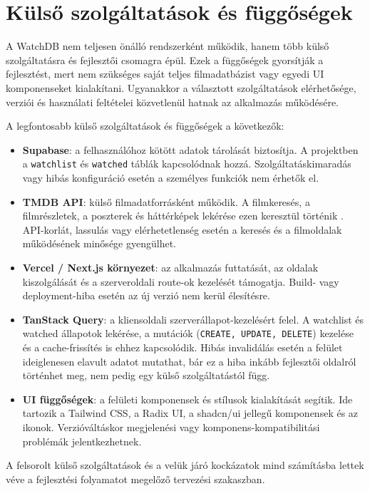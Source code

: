 \section{Külső szolgáltatások és függőségek}

A WatchDB nem teljesen önálló rendszerként működik, hanem több külső szolgáltatásra és fejlesztői csomagra épül. Ezek a függőségek gyorsítják a fejlesztést, mert nem szükséges saját teljes filmadatbázist vagy egyedi UI komponenseket kialakítani. Ugyanakkor a választott szolgáltatások elérhetősége, verziói és használati feltételei közvetlenül hatnak az alkalmazás működésére.

A legfontosabb külső szolgáltatások és függőségek a következők:

\begin{itemize}
    \item \textbf{Supabase}: a felhasználóhoz kötött adatok tárolását biztosítja. A projektben a \texttt{watchlist} és \texttt{watched} táblák kapcsolódnak hozzá. Szolgáltatáskimaradás vagy hibás konfiguráció esetén a személyes funkciók nem érhetők el.
    \item \textbf{TMDB API}: külső filmadatforrásként működik. A filmkeresés, a filmrészletek, a poszterek és háttérképek lekérése ezen keresztül történik \cite{tmdbApiGettingStarted}. API-korlát, lassulás vagy elérhetetlenség esetén a keresés és a filmoldalak működésének minősége gyengülhet.
    \item \textbf{Vercel / Next.js környezet}: az alkalmazás futtatását, az oldalak kiszolgálását és a szerveroldali route-ok kezelését támogatja. Build- vagy deployment-hiba esetén az új verzió nem kerül élesítésre.
    \item \textbf{TanStack Query}: a kliensoldali szerverállapot-kezelésért felel. A watchlist és watched állapotok lekérése, a mutációk (\texttt{CREATE, UPDATE, DELETE}) kezelése és a cache-frissítés is ehhez kapcsolódik. Hibás invalidálás esetén a felület ideiglenesen elavult adatot mutathat, bár ez a hiba inkább fejlesztői oldalról történhet meg, nem pedig egy külső szolgáltatástól függ.
    \item \textbf{UI függőségek}: a felületi komponensek és stílusok kialakítását segítik. Ide tartozik a Tailwind CSS, a Radix UI, a shadcn/ui jellegű komponensek és az ikonok. Verzióváltáskor megjelenési vagy komponens-kompatibilitási problémák jelentkezhetnek.
\end{itemize}

A felsorolt külső szolgáltatások és a velük járó kockázatok mind számításba lettek véve a fejlesztési folyamatot megelőző tervezési szakaszban.

